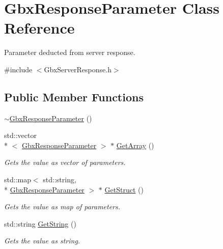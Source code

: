 \hypertarget{classGbxResponseParameter}{\section{Gbx\-Response\-Parameter Class Reference}
\label{classGbxResponseParameter}
}


Parameter deducted from server response.  




{\ttfamily \#include $<$Gbx\-Server\-Response.\-h$>$}

\subsection*{Public Member Functions}
\begin{DoxyCompactItemize}
\item 
\hyperlink{classGbxResponseParameter_a168717d1eb2785d1c02b50c4cff5e0c7}{$\sim$\-Gbx\-Response\-Parameter} ()
\item 
std\-::vector\\*
$<$ \hyperlink{classGbxResponseParameter}{Gbx\-Response\-Parameter} $>$ $\ast$ \hyperlink{classGbxResponseParameter_a0cf214feb9ff46a353e999720ffea8d3}{Get\-Array} ()
\begin{DoxyCompactList}\small\item\em Gets the value as vector of parameters. \end{DoxyCompactList}\item 
std\-::map$<$ std\-::string, \\*
\hyperlink{classGbxResponseParameter}{Gbx\-Response\-Parameter} $>$ $\ast$ \hyperlink{classGbxResponseParameter_a11bee88d2b24ed96419b49ec78bbb8fc}{Get\-Struct} ()
\begin{DoxyCompactList}\small\item\em Gets the value as map of parameters. \end{DoxyCompactList}\item 
std\-::string \hyperlink{classGbxResponseParameter_a014af0f74e937d9002cda3e6e791735b}{Get\-String} ()
\begin{DoxyCompactList}\small\item\em Gets the value as string. \end{DoxyCompactList}\end{DoxyCompactItemize}
